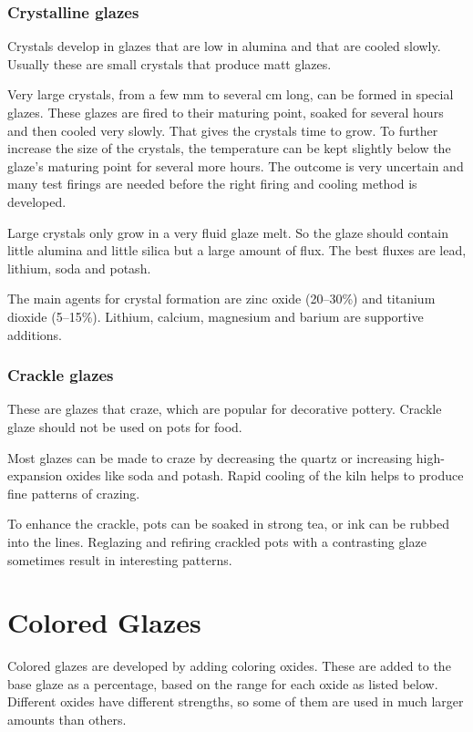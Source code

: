 \subsubsection{Crystalline glazes}
Crystals develop in glazes that are low in alumina and that are cooled slowly. 
Usually these are small crystals that produce matt glazes.

Very large crystals, from a few mm to several cm long, can be formed in special 
glazes. These glazes are fired to their maturing point, soaked for several 
hours and then cooled very slowly. That gives the crystals time to grow. To 
further increase the size of the crystals, the temperature can be kept slightly 
below the glaze's maturing point for several more hours. The outcome is very 
uncertain and many test firings are needed before the right firing and cooling 
method is developed.

Large crystals only grow in a very fluid glaze melt. So the glaze should 
contain little alumina and little silica but a large amount of flux. The best 
fluxes are lead, lithium, soda and potash.

The main agents for crystal formation are zinc oxide (20--30\%) and titanium 
dioxide (5--15\%). Lithium, calcium, magnesium and barium are supportive 
additions.
\subsubsection{Crackle glazes}
These are glazes that craze, which are popular for decorative pottery. Crackle 
glaze should not be used on pots for food.

Most glazes can be made to craze by decreasing the quartz or increasing 
high-expansion oxides like soda and potash. Rapid cooling of the kiln helps to 
produce fine patterns of crazing.

To enhance the crackle, pots can be soaked in strong tea, or ink can be rubbed 
into the lines. Reglazing and refiring crackled pots with a contrasting glaze 
sometimes result in interesting patterns.
\section{Colored Glazes}
Colored glazes are developed by adding coloring oxides. These are added to the 
base glaze as a percentage, based on the range for each oxide as listed below. 
Different oxides have different strengths, so some of them are used in much 
larger amounts than others.

